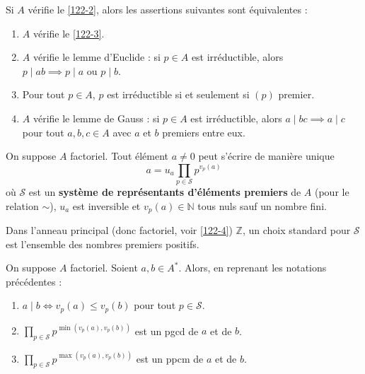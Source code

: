 
	\begin{proposition}
		Si $A$ vérifie le \cref{122-2}, alors les assertions suivantes sont équivalentes :
		\begin{enumerate}[label=(\roman*)]
			\item $A$ vérifie le \cref{122-3}.
			\item $A$ vérifie le lemme d'Euclide : si $p \in A$ est irréductible, alors $p \mid ab \implies p \mid a \text { ou } p \mid b$.
			\item Pour tout $p \in A$, $p$ est irréductible si et seulement si $(p)$ premier.
			\item $A$ vérifie le lemme de Gauss : si $p \in A$ est irréductible, alors $a \mid bc \implies a \mid c$ pour tout $a, b, c \in A$ avec $a$ et $b$ premiers entre eux.
		\end{enumerate}
	\end{proposition}

	\reference[ULM18]{65}

	\begin{proposition}
		On suppose $A$ factoriel. Tout élément $a \neq 0$ peut s'écrire de manière unique
		\[ a = u_a \prod_{p \in \mathcal{S}} p^{v_p(a)} \]
		où $\mathcal{S}$ est un \textbf{système de représentants d'éléments premiers} de $A$ (pour le relation $\sim$), $u_a$ est inversible et $v_p(a) \in \mathbb{N}$ tous nuls sauf un nombre fini.
	\end{proposition}

	\begin{example}
		Dans l'anneau principal (donc factoriel, voir \cref{122-4}) $\mathbb{Z}$, un choix standard pour $\mathcal{S}$ est l'ensemble des nombres premiers positifs.
	\end{example}

	\begin{proposition}
		On suppose $A$ factoriel. Soient $a, b \in A^*$. Alors, en reprenant les notations précédentes :
		\begin{enumerate}[label=(\roman*)]
			\item $a \mid b \iff v_p(a) \leq v_p(b)$ pour tout $p \in \mathcal{S}$.
			\item $\prod_{p \in \mathcal{S}} p^{\min(v_p(a), v_p(b))}$ est un pgcd de $a$ et de $b$.
			\item $\prod_{p \in \mathcal{S}} p^{\max(v_p(a), v_p(b))}$ est un ppcm de $a$ et de $b$.
		\end{enumerate}
	\end{proposition}

